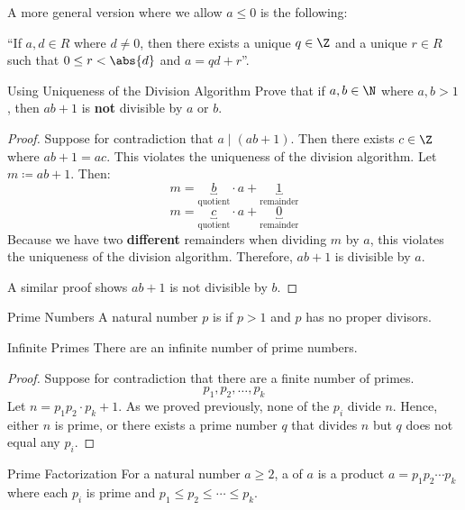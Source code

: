 \documentclass[letterpaper,12pt]{report}
\begin{document}
A more general version where we allow $a \leq 0$ is the following:

``If $a, d \in R$ where $d \neq 0$, then there exists a unique $q \in \Z$ and a unique $r \in R$ such that $0 \leq r < \abs{d}$ and $a = qd+r$''.

\begin{exbox}{Using Uniqueness of the Division Algorithm}{}
    Prove that if $a,b \in \N$ where $a,b > 1$, then $ab+1$ is \textbf{not} divisible by $a$ or $b$.
    \tcblower
    \begin{proof}
        Suppose for contradiction that $a \mid (ab+1)$. Then there exists $c \in \Z$ where $ab+1 = ac$. This violates the uniqueness of the division algorithm.  Let $m \coloneq ab+1$. Then: \[m = \underbracket{b}_{\text{quotient}} \cdot a + \underbracket{1}_{\text{remainder}}\] \[m=\underbracket{c}_{\text{quotient}} \cdot a + \underbracket{0}_{\text{remainder}} \]
        Because we have two \textbf{different} remainders when dividing $m$ by $a$, this violates the uniqueness of the division algorithm. Therefore, $ab+1$ is  divisible by $a$.

        A similar proof shows $ab+1$ is not divisible by $b$.
    \end{proof}
\end{exbox}

\begin{dfnbox}{Prime Numbers}{}
    A natural number $p$ is  if $p>1$ and $p$ has no proper divisors.
\end{dfnbox}

\begin{thmbox}{Infinite Primes}{}
    There are an infinite number of prime numbers.
    \tcblower
    \begin{proof}
        Suppose for contradiction that there are a finite number of primes. \[p_1, p_2, \ldots, p_k\] Let $n = p_1 p_2 \cdot p_k + 1$. As we proved previously, none of the $p_i$ divide $n$. Hence, either $n$ is prime, or there exists a prime number $q$ that divides $n$ but $q$ does not equal any $p_i$.
    \end{proof}
\end{thmbox}

\begin{dfnbox}{Prime Factorization}{}
    For a natural number $a \geq 2$, a  of $a$ is a product $a = p_1 p_2 \cdots p_k$ where each $p_i$ is prime and $p_1 \leq p_2 \leq \cdots \leq p_k$.
\end{dfnbox}
\end{document}
